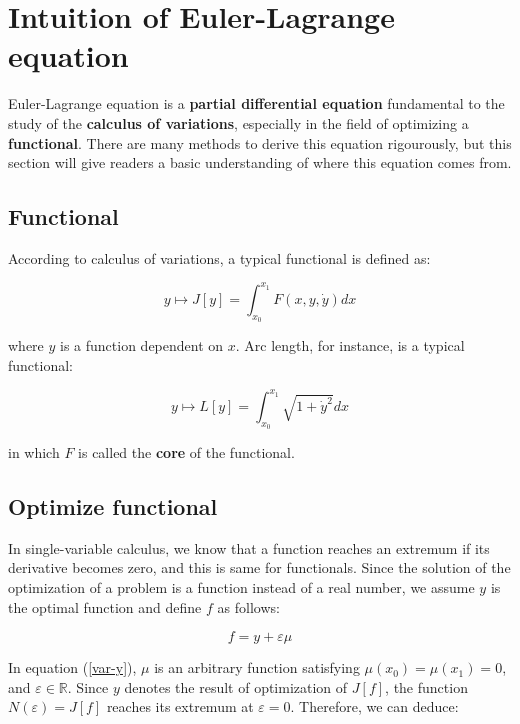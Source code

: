\section{Intuition of Euler-Lagrange equation}

Euler-Lagrange equation is a \textbf{partial differential equation} fundamental
to the study of the \textbf{calculus of variations}, especially in the field of
optimizing a \textbf{functional}. There are many methods to derive this
equation rigourously, but this section will give readers a basic understanding
of where this equation comes from.

\subsection{Functional}

According to calculus of variations, a typical functional is defined as:

\begin{equation}
	y\mapsto J[y]=\int_{x_0}^{x_1}F(x,y,\dot{y})dx
	\label{functional-def}
\end{equation}

where $y$ is a function dependent on $x$. Arc length, for instance, is a
typical functional:

$$
y\mapsto L[y]=\int_{x_0}^{x_1}\sqrt{1+\dot{y}^2}dx
$$

in which $F$ is called the \textbf{core} of the functional.

\subsection{Optimize functional}

In single-variable calculus, we know that a function reaches an extremum if its
derivative becomes zero, and this is same for functionals. Since the solution
of the optimization of a problem is a function instead of a real number, we
assume $y$ is the optimal function and define $f$ as follows:

\begin{equation}
	f=y+\varepsilon\mu
	\label{var-y}
\end{equation}

In equation (\ref{var-y}), $\mu$ is an arbitrary function satisfying
$\mu(x_0)=\mu(x_1)=0$, and $\varepsilon\in\mathbb{R}$. Since $y$ denotes the
result of optimization of $J[f]$, the function $N(\varepsilon)=J[f]$ reaches
its extremum at $\varepsilon=0$. Therefore, we can deduce:

